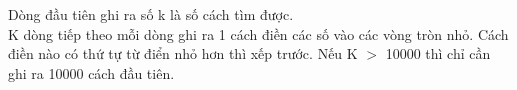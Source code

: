 Dòng đầu tiên ghi ra số k là số cách tìm được.   
\\   K dòng tiếp theo mỗi dòng ghi ra 1 cách điền các số vào các vòng tròn nhỏ. Cách điền nào có thứ tự từ điển nhỏ hơn thì xếp trước. Nếu K $>$ 10000 thì chỉ cần ghi ra 10000 cách đầu tiên.